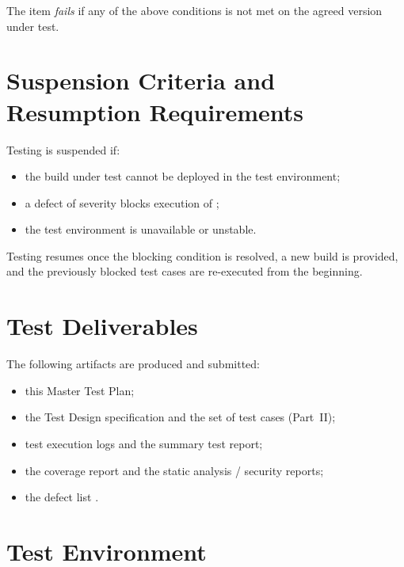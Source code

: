 \documentclass[12pt,a4paper]{extarticle}
\begin{document}
The item \emph{fails} if any of the above conditions is not met on the agreed version under test.

\section{Suspension Criteria and Resumption Requirements}

Testing is suspended if:

\begin{itemize}[leftmargin=1.25cm]
    \item the build under test cannot be deployed in the test environment;
    \item a defect of severity  blocks execution of ;
    \item the test environment is unavailable or unstable.
\end{itemize}

Testing resumes once the blocking condition is resolved, a new build is provided, and the previously blocked test cases are re-executed from the beginning.

\section{Test Deliverables}

The following artifacts are produced and submitted:

\begin{itemize}[leftmargin=1.25cm]
    \item this Master Test Plan;
    \item the Test Design specification and the set of test cases (Part~II);
    \item test execution logs and the summary test report;
    \item the coverage report and the static analysis / security reports;
    \item the defect list .
\end{itemize}

\section{Test Environment}
\end{document}
